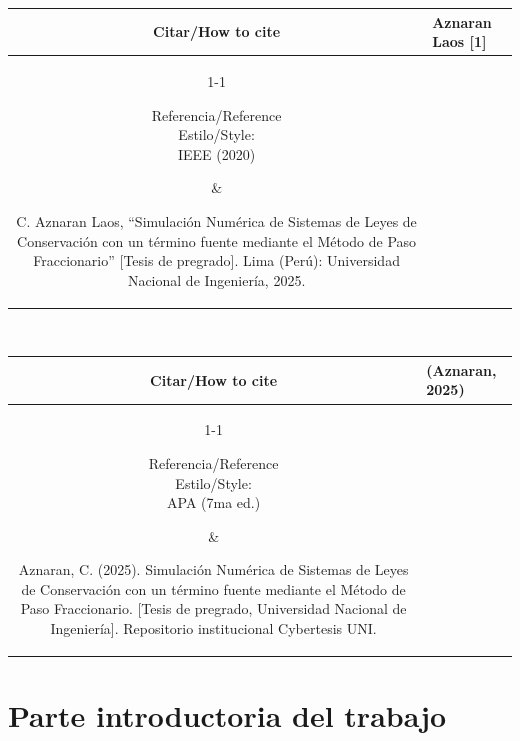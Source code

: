 \newpage
\noindent\begin{tabular}{@{}cl}
	\hline
	Citar/How to cite & Aznaran Laos [1]         \\
	\cline{1-1}
	\parbox{4cm}{\centering Referencia/Reference \\[1pc] Estilo/Style:\\IEEE (2020)} & \parbox{11cm}{\begin{list}{}{\setlength{\labelwidth}{1em}\setlength{\itemindent}{0em}\setlength{\leftmargin}{1.5em}}
			\item[{[1]}] C. Aznaran Laos, ``Simulación Numérica de Sistemas de Leyes de Conservación con un término fuente mediante el Método de Paso Fraccionario'' [Tesis de pregrado]. Lima (Perú): Universidad Nacional de Ingeniería, 2025.
		\end{list}} \\
	\hline
\end{tabular}\\[2\baselineskip]

\noindent\begin{tabular}{@{}cl}
	\hline
	Citar/How to cite & (Aznaran, 2025)          \\
	\cline{1-1}
	\parbox{4cm}{\centering Referencia/Reference \\[1pc] Estilo/Style:\\APA (7ma ed.)} & \parbox{11cm}{\begin{list}{}{\setlength{\labelwidth}{0pt}\setlength{\itemindent}{-0.5in}\setlength{\leftmargin}{0.5in}}
			\item Aznaran, C. (2025). Simulación Numérica de Sistemas de Leyes de Conservación con un término fuente mediante el Método de Paso Fraccionario. [Tesis de pregrado, Universidad Nacional de Ingeniería]. Repositorio institucional Cybertesis UNI.
		\end{list}} \\
	\hline
\end{tabular}






\dominitoc
\tableofcontents
\listoftables{}
\listoffigures{}



\mainmatter
\chapter{Parte introductoria del trabajo}

